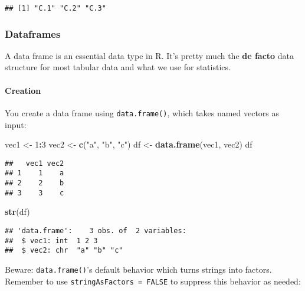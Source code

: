 \documentclass[
]{book}
\newenvironment{Shaded}{\begin{snugshade}}{\end{snugshade}}
\newcommand{\DecValTok}[1]{\textcolor[rgb]{0.00,0.00,0.81}{#1}}
\newcommand{\KeywordTok}[1]{\textcolor[rgb]{0.13,0.29,0.53}{\textbf{#1}}}
\newcommand{\NormalTok}[1]{#1}
\newcommand{\OperatorTok}[1]{\textcolor[rgb]{0.81,0.36,0.00}{\textbf{#1}}}
\newcommand{\StringTok}[1]{\textcolor[rgb]{0.31,0.60,0.02}{#1}}
\begin{document}
\begin{verbatim}
## [1] "C.1" "C.2" "C.3"
\end{verbatim}

\hypertarget{dataframes}{%
\subsubsection{Dataframes}\label{dataframes}}

A data frame is an essential data type in R. It's pretty much the \textbf{de facto} data structure for most tabular data and what we use for statistics.

\hypertarget{creation}{%
\paragraph{Creation}\label{creation}}

You create a data frame using \texttt{data.frame()}, which takes named vectors as input:

\begin{Shaded}
\begin{Highlighting}[]
\NormalTok{vec1 \textless{}{-}}\StringTok{ }\DecValTok{1}\OperatorTok{:}\DecValTok{3}
\NormalTok{vec2 \textless{}{-}}\StringTok{ }\KeywordTok{c}\NormalTok{(}\StringTok{"a"}\NormalTok{, }\StringTok{"b"}\NormalTok{, }\StringTok{"c"}\NormalTok{)}
\NormalTok{df \textless{}{-}}\StringTok{ }\KeywordTok{data.frame}\NormalTok{(vec1, vec2)}
\NormalTok{df}
\end{Highlighting}
\end{Shaded}

\begin{verbatim}
##   vec1 vec2
## 1    1    a
## 2    2    b
## 3    3    c
\end{verbatim}

\begin{Shaded}
\begin{Highlighting}[]
\KeywordTok{str}\NormalTok{(df)}
\end{Highlighting}
\end{Shaded}

\begin{verbatim}
## 'data.frame':    3 obs. of  2 variables:
##  $ vec1: int  1 2 3
##  $ vec2: chr  "a" "b" "c"
\end{verbatim}

Beware: \texttt{data.frame()}'s default behavior which turns strings into factors. Remember to use \texttt{stringAsFactors\ =\ FALSE} to suppress this behavior as needed:
\end{document}
